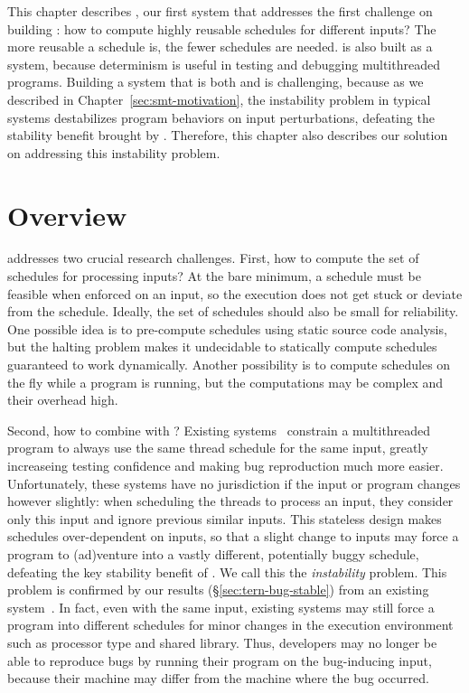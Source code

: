 This chapter describes \tern, our first \smt system that
addresses the first challenge on building \smt: how to compute highly reusable
schedules for different inputs? The more reusable a schedule is, the fewer
schedules are needed. \tern is also built as a \dmt system, because determinism
is useful in testing and debugging multithreaded programs. Building a
system that is both \smt and \dmt is challenging, because as we described in
Chapter~\ref{sec:smt-motivation}, the instability problem in typical \dmt
systems destabilizes program behaviors on input perturbations,
defeating the stability benefit brought by \smt. Therefore, this chapter
also describes our solution on addressing this instability problem.

\section{Overview} \label{sec:tern-overview}

\tern addresses two crucial research challenges. First, how to compute the set
of schedules for processing inputs?  At the bare minimum, a schedule must be
feasible when enforced on an input, so the execution does not get stuck or
deviate from the schedule.  Ideally, the set of schedules should also be small
for reliability.  One possible idea is to pre-compute schedules using static
source code analysis, but the halting problem makes it undecidable to
statically compute schedules guaranteed to work dynamically.  Another
possibility is to compute schedules on the fly while a program is running,
but the computations may be complex and their overhead high.

Second, how to combine \dmt with \smt? Existing \dmt
systems~\cite{dmp:asplos09,coredet:asplos10,kendo:asplos09} constrain a
multithreaded program to always use the same thread schedule for the same input,
greatly increaseing testing confidence and making bug reproduction much more
easier. Unfortunately, these \dmt systems have no jurisdiction if the input or
program changes however slightly: when scheduling the threads to process an
input, they consider only this input and ignore previous similar inputs.  This
stateless design makes schedules over-dependent on inputs, so that a slight
change to inputs may force a program to (ad)venture into a vastly different,
potentially buggy schedule, defeating the key stability benefit of \smt.  We
call this the \emph{instability} problem. This problem is confirmed by our
results (\S\ref{sec:tern-bug-stable}) from an existing \dmt
system~\cite{coredet:asplos10}. In fact, even with the same input, existing \dmt
systems may still force a program into different schedules for minor changes in
the execution environment such as processor type and shared library.  Thus,
developers may no longer be able to reproduce bugs by running their
program on the bug-inducing input, because their machine may differ from
the machine where the bug occurred.

